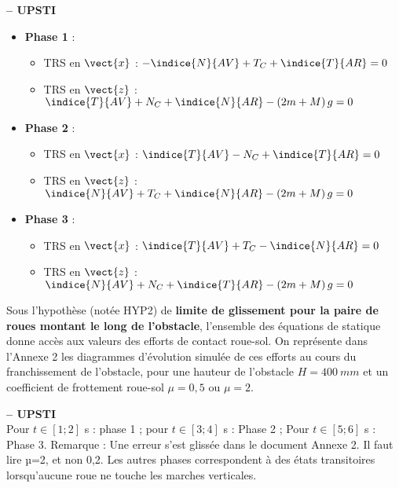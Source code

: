 \ifprof
\begin{corrige}\textbf{ -- UPSTI}\\ 
\begin{itemize}
\item \textbf{Phase 1} : 
\begin{itemize} 
\item TRS en $\vect{x}$ : $-\indice{N}{AV}+T_C+\indice{T}{AR}=0$
\item TRS en $\vect{z}$ : $\indice{T}{AV}+N_C+\indice{N}{AR}-\left(2m + M\right)g=0$
\end{itemize}
\item \textbf{Phase 2} : 
\begin{itemize} 
\item TRS en $\vect{x}$ : $\indice{T}{AV}-N_C+\indice{T}{AR}=0$
\item TRS en $\vect{z}$ : $\indice{N}{AV}+T_C+\indice{N}{AR}-\left(2m + M\right)g=0$
\end{itemize}
\item \textbf{Phase 3} : 
\begin{itemize} 
\item TRS en $\vect{x}$ : $\indice{T}{AV}+T_C-\indice{N}{AR}=0$
\item TRS en $\vect{z}$ : $\indice{N}{AV}+N_C+\indice{T}{AR}-\left(2m + M\right)g=0$
\end{itemize}
\end{itemize}
\end{corrige}
\else
\fi

Sous l'hypothèse (notée HYP2) de \textbf{limite de glissement pour la paire de roues montant le long de l'obstacle}, l'ensemble des équations de statique donne accès aux valeurs des efforts de contact roue-sol. On représente dans l'Annexe 2 les diagrammes d'évolution simulée de ces efforts au cours du franchissement de l'obstacle, pour une hauteur de l'obstacle $H =\SI{400}{mm}$ et un coefficient de frottement roue-sol $\mu = 0,5$ ou $\mu = 2$.

\ifprof
\begin{corrige}\textbf{ -- UPSTI}\\ 
Pour $t\in [1;2]$ s : phase 1 ; pour $t\in [3;4]$ s :  Phase 2 ; Pour $t\in [5;6]$ s : Phase 3.
Remarque : Une erreur s’est glissée dans le document Annexe 2. Il faut lire µ=2, et non 0,2.
Les autres phases correspondent à des états transitoires lorsqu’aucune roue ne touche les marches verticales.
\end{corrige}
\else
\fi

